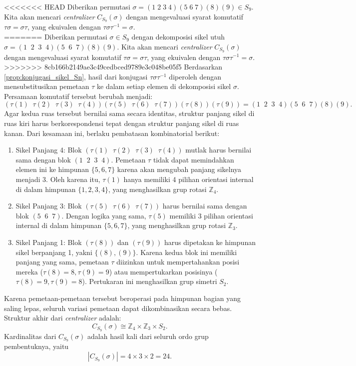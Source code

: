 \begin{contoh}
  <<<<<<< HEAD
  Diberikan permutasi $\sigma = (1\; 2\; 3\; 4)(5\; 6\; 7)(8)(9)\in S_9$. Kita akan mencari \emph{centralizer} $C_{S_9}(\sigma)$ dengan mengevaluasi syarat komutatif $\tau \sigma = \sigma \tau$, yang ekuivalen dengan $\tau \sigma \tau^{-1} = \sigma$.\\
  =======
  Diberikan permutasi $\sigma \in S_9$ dengan dekomposisi sikel utuh $\sigma = (1\;\; 2\;\; 3\;\; 4)(5\;\; 6\;\; 7)(8)(9)$. Kita akan mencari \emph{centralizer} $C_{S_9}(\sigma)$ dengan mengevaluasi syarat komutatif $\tau \sigma = \sigma \tau$, yang ekuivalen dengan $\tau \sigma \tau^{-1} = \sigma$.\\
  >>>>>>> 8cb166b2149ae3c49cedbced9789e3c048be05f5
  Berdasarkan \autoref{prop:konjugasi_sikel_Sn}, hasil dari konjugasi $\tau \sigma \tau^{-1}$ diperoleh dengan mensubstitusikan pemetaan $\tau$ ke dalam setiap elemen di dekomposisi sikel $\sigma$. Persamaan komutatif tersebut berubah menjadi:
  \[
    (\tau(1)\;\; \tau(2)\;\; \tau(3)\;\; \tau(4))(\tau(5)\;\; \tau(6)\;\; \tau(7))(\tau(8))(\tau(9)) = (1\;\; 2\;\; 3\;\; 4)(5\;\; 6\;\; 7)(8)(9).
  \]
  Agar kedua ruas tersebut bernilai sama secara identitas, struktur panjang sikel di ruas kiri harus berkorespondensi tepat dengan struktur panjang sikel di ruas kanan. Dari kesamaan ini, berlaku pembatasan kombinatorial berikut:
  \begin{enumerate}
    \item Sikel Panjang 4: Blok $(\tau(1)\;\; \tau(2)\;\; \tau(3)\;\; \tau(4))$ mutlak harus bernilai sama dengan blok $(1\;\; 2\;\; 3\;\; 4)$. Pemetaan $\tau$ tidak dapat memindahkan elemen ini ke himpunan $\{5, 6, 7\}$ karena akan mengubah panjang sikelnya menjadi 3. Oleh karena itu, $\tau(1)$ hanya memiliki 4 pilihan orientasi internal di dalam himpunan $\{1, 2, 3, 4\}$, yang menghasilkan grup rotasi $\mathbb{Z}_4$.
    \item Sikel Panjang 3: Blok $(\tau(5)\;\; \tau(6)\;\; \tau(7))$ harus bernilai sama dengan blok $(5\;\; 6\;\; 7)$. Dengan logika yang sama, $\tau(5)$ memiliki 3 pilihan orientasi internal di dalam himpunan $\{5, 6, 7\}$, yang menghasilkan grup rotasi $\mathbb{Z}_3$.
    \item Sikel Panjang 1: Blok $(\tau(8))$ dan $(\tau(9))$ harus dipetakan ke himpunan sikel berpanjang 1, yakni $\{(8), (9)\}$. Karena kedua blok ini memiliki panjang yang sama, pemetaan $\tau$ diizinkan untuk mempertahankan posisi mereka ($\tau(8)=8, \tau(9)=9$) atau mempertukarkan posisinya ($\tau(8)=9, \tau(9)=8$). Pertukaran ini menghasilkan grup simetri $S_2$.
  \end{enumerate}
  Karena pemetaan-pemetaan tersebut beroperasi pada himpunan bagian yang saling lepas, seluruh variasi pemetaan dapat dikombinasikan secara bebas. Struktur akhir dari \emph{centralizer} adalah:
  \[
    C_{S_9}(\sigma) \cong \mathbb{Z}_4 \times \mathbb{Z}_3 \times S_2.
  \]
  Kardinalitas dari $C_{S_9}(\sigma)$ adalah hasil kali dari seluruh ordo grup pembentuknya, yaitu
  \[
    |C_{S_9}(\sigma)| = 4 \times 3 \times 2 = 24.
  \]
\end{contoh}

